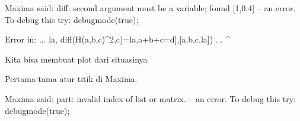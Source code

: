 \documentclass[a4paper,10pt]{article}
\begin{document}
\begin{eulernotebook}
\begin{eulercomment}
\begin{eulercomment}
\begin{eulercomment}
\begin{eulercomment}
\begin{eulercomment}
\begin{eulercomment}
\begin{eulercomment}
\begin{eulercomment}
\begin{eulercomment}
\begin{eulercomment}
\begin{eulercomment}
\begin{eulercomment}
\begin{eulercomment}
\begin{eulercomment}
\begin{eulercomment}
\begin{eulercomment}
\begin{eulercomment}
\begin{eulercomment}
\begin{eulerprompt}
\end{eulerprompt}
\begin{euleroutput}
  Maxima said:
  diff: second argument must be a variable; found [1,0,4]
   -- an error. To debug this try: debugmode(true);
  
  Error in:
  ... la,    diff(H(a,b,c)^2,c)=la,a+b+c=d],[a,b,c,la]) ...
                                                       ^
\end{euleroutput}
\begin{eulercomment}
Kita bisa membuat plot dari situasinya
\end{eulercomment}
\begin{eulercomment}
Pertama-tama atur titik di Maxima.
\end{eulercomment}
\begin{euleroutput}
  Maxima said:
  part: invalid index of list or matrix.
   -- an error. To debug this try: debugmode(true);
  

\end{euleroutput}
\end{eulercomment}
\end{eulercomment}
\end{eulercomment}
\end{eulercomment}
\end{eulercomment}
\end{eulercomment}
\end{eulercomment}
\end{eulercomment}
\end{eulercomment}
\end{eulercomment}
\end{eulercomment}
\end{eulercomment}
\end{eulercomment}
\end{eulercomment}
\end{eulercomment}
\end{eulercomment}
\end{eulercomment}
\end{eulercomment}
\end{eulernotebook}
\end{document}
